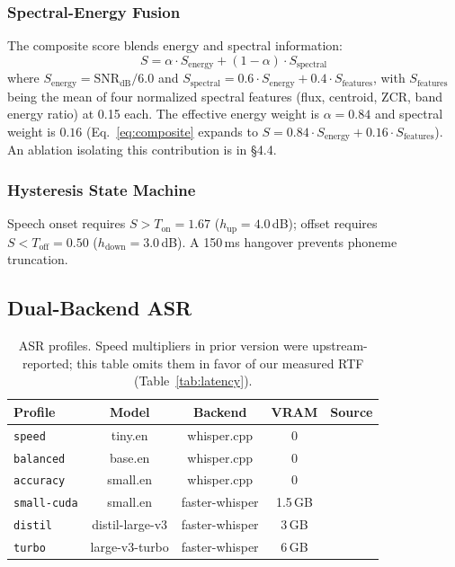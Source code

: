 \documentclass[11pt]{article}
\begin{document}
\subsubsection{Spectral-Energy Fusion}
The composite score blends energy and spectral information:
\begin{equation}
S = \alpha \cdot S_{\text{energy}} + (1 - \alpha) \cdot S_{\text{spectral}}
\label{eq:composite}
\end{equation}
where $S_{\text{energy}} = \text{SNR}_{\text{dB}} / 6.0$ and
$S_{\text{spectral}} = 0.6 \cdot S_{\text{energy}} + 0.4 \cdot S_{\text{features}}$,
with $S_{\text{features}}$ being the mean of four normalized spectral features (flux,
centroid, ZCR, band energy ratio) at 0.15 each. The effective energy weight is
$\alpha = 0.84$ and spectral weight is $0.16$ (Eq.~\ref{eq:composite} expands to
$S = 0.84 \cdot S_{\text{energy}} + 0.16 \cdot S_{\text{features}}$). An ablation
isolating this contribution is in \S4.4.

\subsubsection{Hysteresis State Machine}
Speech onset requires $S > T_{\text{on}} = 1.67$ ($h_{\text{up}} = 4.0$\,dB); offset
requires $S < T_{\text{off}} = 0.50$ ($h_{\text{down}} = 3.0$\,dB). A 150\,ms hangover
prevents phoneme truncation.

\subsection{Dual-Backend ASR}

\begin{table}[t]
\centering
\small
\begin{tabular}{@{}lcccc@{}}
\toprule
\textbf{Profile} & \textbf{Model} & \textbf{Backend} & \textbf{VRAM} & \textbf{Source} \\
\midrule
\texttt{speed} & tiny.en & whisper.cpp & 0 & \cite{whisper_cpp} \\
\texttt{balanced} & base.en & whisper.cpp & 0 & \cite{whisper_cpp} \\
\texttt{accuracy} & small.en & whisper.cpp & 0 & \cite{whisper_cpp} \\
\texttt{small-cuda} & small.en & faster-whisper & 1.5\,GB & \cite{faster_whisper} \\
\texttt{distil} & distil-large-v3 & faster-whisper & 3\,GB & \cite{faster_whisper} \\
\texttt{turbo} & large-v3-turbo & faster-whisper & 6\,GB & \cite{whisper_large_v3_turbo} \\
\bottomrule
\end{tabular}
\caption{ASR profiles. Speed multipliers in prior version were upstream-reported; this
table omits them in favor of our measured RTF (Table~\ref{tab:latency}).}
\label{tab:profiles}
\end{table}
\end{document}
